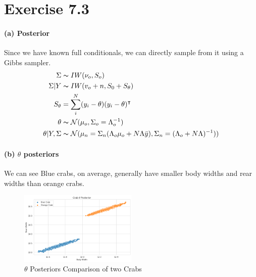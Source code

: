 \documentclass[11pt, letterpaper]{article}
\begin{document}
\section{Exercise 7.3}
\paragraph{(a) Posterior}
Since we have known full conditionals, we can directly sample from it using a Gibbs sampler.
\begin{align*}
    \Sigma &\thicksim IW(\nu_o, S_o) \\ 
    \Sigma|Y &\thicksim IW(v_o + n, S_0+S_{\theta}) \\
    S_{\theta} &= \sum_i^N (y_i - \theta)(y_i - \theta)^{\intercal} \\
    \theta &\thicksim \mathcal{N}(\mu_o, \Sigma_o = \Lambda_o^{-1}) \\
    \theta|Y, \Sigma &\thicksim \mathcal{N}(
        \mu_n = \Sigma_n(\Lambda_o\mu_o+N\Lambda\bar{y}),
        \Sigma_n = (\Lambda_o + N\Lambda)^{-1})
    )    
\end{align*}

\paragraph{(b) $\theta$ posteriors}
We can see Blue crabs, on average, generally have smaller body widths and rear widths than orange crabs.
\begin{figure}[!h]
  \centering
  \includegraphics[width=0.5\textwidth]{3.1.png}
  \captionsetup{justification=centering}
  \caption{$\theta$ Posteriors Comparison of two Crabs}
\end{figure}

\newpage
\end{document}
